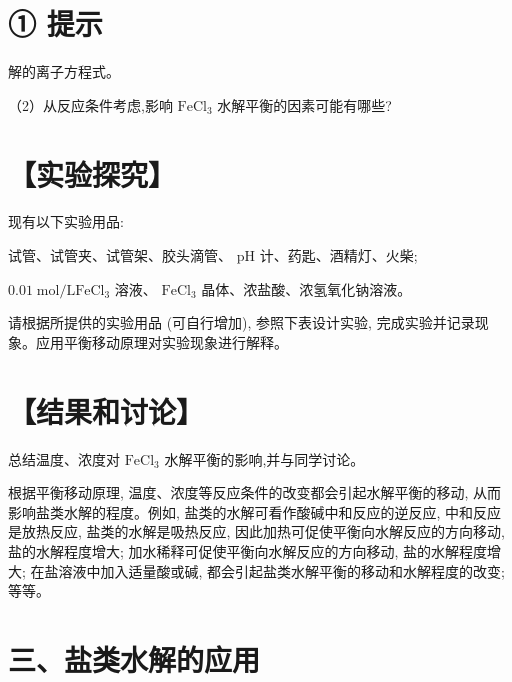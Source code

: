 \documentclass[10pt]{article}
\begin{document}
\section*{① 提示}

解的离子方程式。

（2）从反应条件考虑,影响 \({\mathrm{{FeCl}}}_{3}\) 水解平衡的因素可能有哪些?

\section*{【实验探究】}

现有以下实验用品:

试管、试管夹、试管架、胶头滴管、 \(\mathrm{{pH}}\) 计、药匙、酒精灯、火柴;

\({0.01}\mathrm{\;{mol}}/\mathrm{L}{\mathrm{{FeCl}}}_{3}\) 溶液、 \({\mathrm{{FeCl}}}_{3}\) 晶体、浓盐酸、浓氢氧化钠溶液。

请根据所提供的实验用品 (可自行增加), 参照下表设计实验, 完成实验并记录现象。应用平衡移动原理对实验现象进行解释。

\begin{center}
\end{center}

\section*{【结果和讨论】}

总结温度、浓度对 \({\mathrm{{FeCl}}}_{3}\) 水解平衡的影响,并与同学讨论。

根据平衡移动原理, 温度、浓度等反应条件的改变都会引起水解平衡的移动, 从而影响盐类水解的程度。例如, 盐类的水解可看作酸碱中和反应的逆反应, 中和反应是放热反应, 盐类的水解是吸热反应, 因此加热可促使平衡向水解反应的方向移动, 盐的水解程度增大; 加水稀释可促使平衡向水解反应的方向移动, 盐的水解程度增大; 在盐溶液中加入适量酸或碱, 都会引起盐类水解平衡的移动和水解程度的改变; 等等。

\section*{三、盐类水解的应用}
\end{document}
